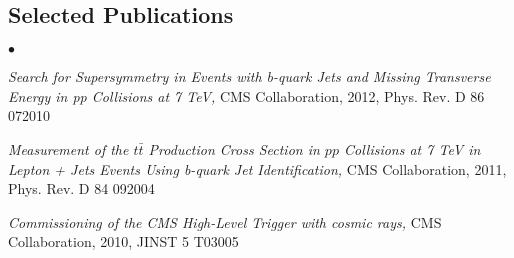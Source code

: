 \documentclass[margin,line]{res}
\newenvironment{list2}{
  \begin{list}{$\bullet$}{%
      \setlength{\itemsep}{0in}
      \setlength{\parsep}{0in} \setlength{\parskip}{0in}
      \setlength{\topsep}{0in} \setlength{\partopsep}{0in} 
      \setlength{\leftmargin}{0.2in}}}{\end{list}}
\begin{document}
\begin{resume}
\section{\sc Selected Publications}
\begin{list2}
\item \textit{Search for Supersymmetry in Events with b-quark Jets and Missing Transverse Energy in pp Collisions at 7 TeV,} CMS Collaboration, 2012, Phys. Rev. D 86 072010
\item \textit{Measurement of the $t\bar{t}$ Production Cross Section
  in $pp$ Collisions at 7 TeV in Lepton + Jets Events Using b-quark
  Jet Identification,} CMS Collaboration, 2011, Phys. Rev. D 84 092004
\item \textit{Commissioning of the CMS High-Level Trigger with cosmic rays,} CMS Collaboration, 2010, JINST 5 T03005
\end{list2}
%
%
%
%
%
%
%
%
%


\end{resume}
\end{document}

